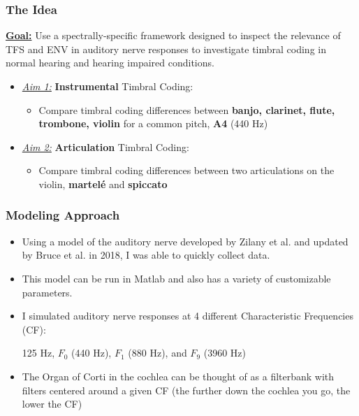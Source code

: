 \documentclass[aspectratio=1610]{beamer}
\begin{document}
\begin{frame}
\frametitle{The Idea}

\textbf{\underline{Goal:}} Use a spectrally-specific framework designed to inspect the relevance of TFS and ENV in auditory nerve responses to investigate timbral coding in normal hearing and hearing impaired conditions. \vspace{1em}
\begin{itemize}
\item \textit{\underline{Aim 1:}} \textbf{Instrumental} Timbral Coding:
\begin{itemize}[label = $\blacktriangleright$]
\item Compare timbral coding differences between \textbf{banjo, clarinet, flute, trombone, violin} for a common pitch, \textbf{A4} (440 Hz)
\end{itemize}\vspace{1em}

\item \textit{\underline{Aim 2:}} \textbf{Articulation} Timbral Coding:
\begin{itemize}[label = $\blacktriangleright$]
\item Compare timbral coding differences between two articulations on the violin, \textbf{martel\'{e}} and \textbf{spiccato}
\end{itemize}

\end{itemize}
\end{frame}

\begin{frame}
\frametitle{Modeling Approach}

\begin{itemize}[label = $\blacktriangleright$]
\item Using a model of the auditory nerve developed by Zilany et al. and updated by Bruce et al. in 2018, I was able to quickly collect data. \vspace{.5em}

\item This model can be run in Matlab and also has a variety of customizable parameters.\vspace{.5em}

\item I simulated auditory nerve responses at 4 different Characteristic Frequencies (CF): \\
\begin{center}
125 Hz, $F_0$ (440 Hz), $F_1$ (880 Hz), and $F_9$ (3960 Hz)
\end{center}\vspace{.5em}

\item The Organ of Corti in the cochlea can be thought of as a filterbank with filters centered around a given CF (the further down the cochlea you go, the lower the CF) 
\end{itemize}

\end{frame}
\end{document}
